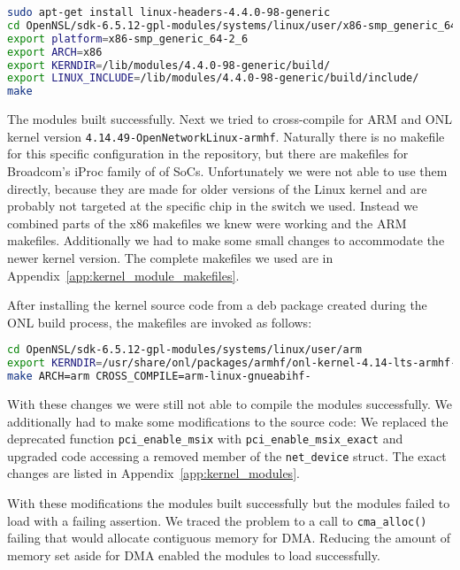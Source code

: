 \documentclass[a4paper]{article}
\begin{document}
\begin{lstlisting}[language=bash]
sudo apt-get install linux-headers-4.4.0-98-generic
cd OpenNSL/sdk-6.5.12-gpl-modules/systems/linux/user/x86-smp_generic_64-2_6
export platform=x86-smp_generic_64-2_6
export ARCH=x86
export KERNDIR=/lib/modules/4.4.0-98-generic/build/
export LINUX_INCLUDE=/lib/modules/4.4.0-98-generic/build/include/
make
\end{lstlisting}

The modules built successfully. Next we tried to cross-compile for ARM and ONL kernel version \texttt{4.14.49-OpenNetworkLinux-armhf}. Naturally there is no makefile for this specific configuration in the repository, but there are makefiles for Broadcom's iProc family of of SoCs. Unfortunately we were not able to use them directly, because they are made for older versions of the Linux kernel and are probably not targeted at the specific chip in the switch we used. Instead we combined parts of the x86 makefiles we knew were working and the ARM makefiles. Additionally we had to make some small changes to accommodate the newer kernel version. The complete makefiles we used are in Appendix~\ref{app:kernel_module_makefiles}.

After installing the kernel source code from a deb package created during the ONL build process, the makefiles are invoked as follows:

\begin{lstlisting}[language=bash, breaklines=true]
cd OpenNSL/sdk-6.5.12-gpl-modules/systems/linux/user/arm
export KERNDIR=/usr/share/onl/packages/armhf/onl-kernel-4.14-lts-armhf-iproc-all/mbuilds
make ARCH=arm CROSS_COMPILE=arm-linux-gnueabihf-
\end{lstlisting}

With these changes we were still not able to compile the modules successfully. We additionally had to make some modifications to the source code: We replaced the deprecated function \texttt{pci\_enable\_msix} with \texttt{pci\_enable\_msix\_exact} and upgraded code accessing a removed member of the \texttt{net\_device} struct. The exact changes are listed in Appendix~\ref{app:kernel_modules}.

With these modifications the modules built successfully but the modules failed to load with a failing assertion. We traced the problem to a call to \texttt{cma\_alloc()} failing that would allocate contiguous memory for DMA. Reducing the amount of memory set aside for DMA enabled the modules to load successfully.
\end{document}
